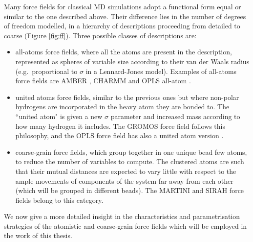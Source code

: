 Many force fields for classical MD simulations adopt a functional form equal or similar to the one described above. Their difference lies in the number of degrees of freedom modelled, in a hierarchy of descriptions proceeding from detailed to coarse (Figure \ref{fig:ff}). Three possible classes of descriptions are:
\begin{itemize}
\item all-atoms force fields, where all the atoms are present in the description, represented as spheres of variable size according to their van der Waals radius (e.g.\ proportional to $\sigma$ in a Lennard-Jones model). Examples of all-atoms force fields are AMBER \cite{Maier2015,Dickson2014,Wang2004_amber}, CHARMM \cite{MacKerell1998,Klauda2010,Huang2013} and OPLS all-atom \cite{Jorgensen1988}.
\item united atoms force fields, similar to the previous ones but where non-polar hydrogens are incorporated in the heavy atom they are bonded to. The ``united atom" is given a new $\sigma$ parameter and increased mass according to how many hydrogen it includes. The GROMOS force field \cite{Oostenbrink2004,Schmid2011} follows this philosophy, and the OPLS force field has also a united atom version \cite{Jorgensen1996}.
\item coarse-grain force fields, which group together in one unique bead few atoms, to reduce the number of variables to compute. The clustered atoms are such that their mutual distances are expected to vary little with respect to the ample movements of components of the system far away from each other (which will be grouped in different beads). The MARTINI \cite{Marrink2007,Monticelli2008,DeJong2013} and SIRAH \cite{Machado2018,Barrera2019} force fields belong to this category.
\end{itemize}
%
We now give a more detailed insight in the characteristics and parametrisation strategies of the atomistic and coarse-grain force fields which will be employed in the work of this thesis.

